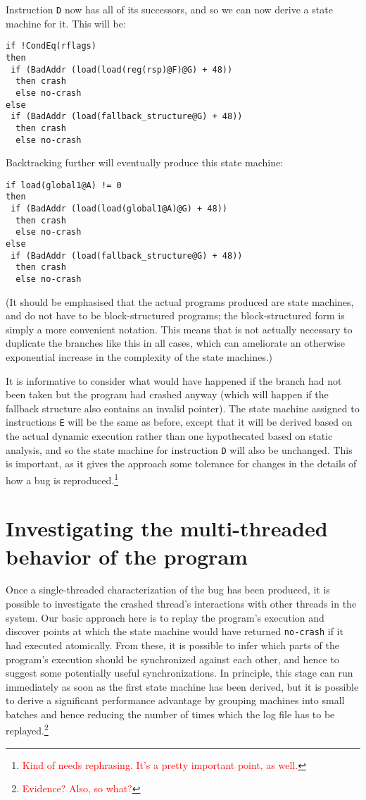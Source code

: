 \documentclass[10pt,twocolumn,preprint,natbib,authoryear]{sigplanconf}
\newcommand{\editorial}[1]{\textcolor{red}{\footnote{\textcolor{red}{#1}}}}
\begin{document}
Instruction \verb|D| now has all of its successors, and so we can
now derive a state machine for it.  This will be:

\begin{verbatim}
if !CondEq(rflags)
then
 if (BadAddr (load(load(reg(rsp)@F)@G) + 48))
  then crash
  else no-crash
else
 if (BadAddr (load(fallback_structure@G) + 48))
  then crash
  else no-crash
\end{verbatim}

Backtracking further will eventually produce this state machine:

\begin{verbatim}
if load(global1@A) != 0
then
 if (BadAddr (load(load(global1@A)@G) + 48))
  then crash
  else no-crash
else
 if (BadAddr (load(fallback_structure@G) + 48))
  then crash
  else no-crash
\end{verbatim}

(It should be emphasised that the actual programs produced are state
machines, and do not have to be block-structured programs; the
block-structured form is simply a more convenient notation.  This
means that is not actually necessary to duplicate the branches like
this in all cases, which can ameliorate an otherwise exponential
increase in the complexity of the state machines.)

It is informative to consider what would have happened if the branch
had not been taken but the program had crashed anyway (which will
happen if the fallback structure also contains an invalid pointer).
The state machine assigned to instructions \verb|E| will be the same
as before, except that it will be derived based on the actual dynamic
execution rather than one hypothecated based on static analysis, and
so the state machine for instruction \verb|D| will also be unchanged.
This is important, as it gives the approach some tolerance for changes
in the details of how a bug is reproduced.\editorial{Kind of needs
  rephrasing.  It's a pretty important point, as well.}

\section{Investigating the multi-threaded behavior of the program}
\label{sect:multi_threading}

Once a single-threaded characterization of the bug has been produced,
it is possible to investigate the crashed thread's interactions with
other threads in the system.  Our basic approach here is to replay the
program's execution and discover points at which the state machine
would have returned \verb|no-crash| if it had executed atomically.
From these, it is possible to infer which parts of the program's
execution should be synchronized against each other, and hence to
suggest some potentially useful synchronizations.  In principle, this
stage can run immediately as soon as the first state machine has been
derived, but it is possible to derive a significant performance
advantage by grouping machines into small batches and hence reducing
the number of times which the log file has to be
replayed.\editorial{Evidence?  Also, so what?}
\end{document}
